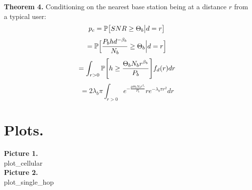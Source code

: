 \begin {framed}
{\bf Theorem 4.}
Conditioning on the nearest base station being at a distance $r$ from a typical user:
	$$p_c = \P\big[SNR\ge\Theta_b\big| d=r\big]$$
	$$= \P\Big[\frac{P_bhd^{-\beta_b}}{N_b}\ge\Theta_b\Big|d=r\Big]$$
	$$= \int_{r>0}\P\Bigg[h\ge\frac{\Theta_b N_b r^{\beta_b}}{P_b}\Bigg]f_d(r)dr$$
	$$= 2\lambda_b\pi\int_{r>0}e^{-\frac{\mu\Theta_b N_b r^{\beta_b}}{P_b}}re^{-\lambda_b\pi r^2}dr$$
\end {framed}

\section {Plots.}
{\bf Picture 1.}
\\
 {plot_cellular}
\\{\bf Picture 2.}
\\
 {plot_single_hop}


